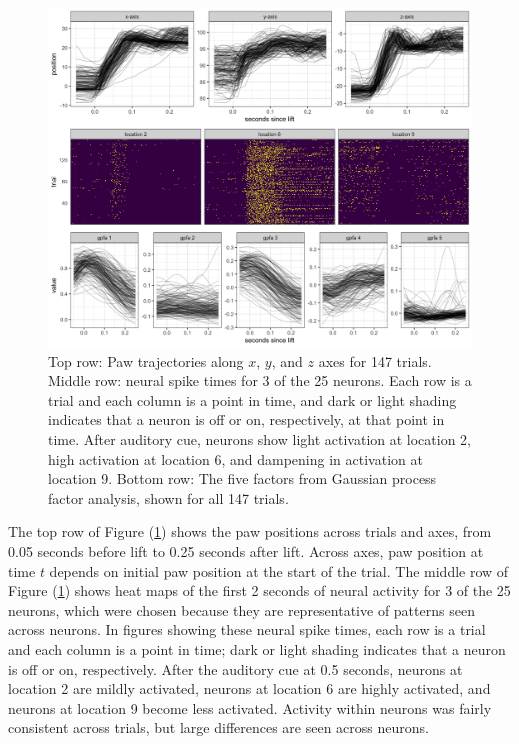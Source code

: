 \documentclass[preprint]{JASA}
\begin{document}
\begin{figure}
\includegraphics[width=\reprintcolumnwidth]{figs/fig_data_eda-1} \caption{Top row: Paw trajectories along $x$, $y$, and $z$ axes for 147 trials. Middle row: neural spike times for 3 of the 25 neurons. Each row is a trial and each column is a point in time, and dark or light shading indicates that a neuron is off or on, respectively, at that point in time. After auditory cue, neurons show light activation at location 2, high activation at location 6, and dampening in activation at location 9. Bottom row: The five factors from Gaussian process factor analysis, shown for all 147 trials.}\label{fig:flode_data}
\end{figure}

The top row of Figure (\ref{fig:flode_data}) shows the paw positions
across trials and axes, from 0.05 seconds before lift to 0.25 seconds
after lift. Across axes, paw position at time \(t\) depends on initial
paw position at the start of the trial. The middle row of Figure
(\ref{fig:flode_data}) shows heat maps of the first 2 seconds of neural
activity for 3 of the 25 neurons, which were chosen because they are
representative of patterns seen across neurons. In figures showing these
neural spike times, each row is a trial and each column is a point in
time; dark or light shading indicates that a neuron is off or on,
respectively. After the auditory cue at 0.5 seconds, neurons at location
2 are mildly activated, neurons at location 6 are highly activated, and
neurons at location 9 become less activated. Activity within neurons was
fairly consistent across trials, but large differences are seen across
neurons.
\end{document}
